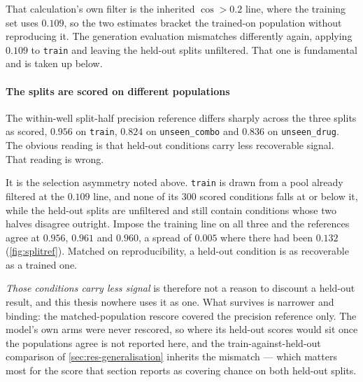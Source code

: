 That calculation's own filter is the inherited $\cos > 0.2$ line, where the
training set uses $0.109$, so the two estimates bracket the trained-on
population without reproducing it. The generation evaluation mismatches
differently again, applying $0.109$ to \texttt{train} and leaving the held-out
splits unfiltered. That one is fundamental and is taken up below.

\paragraph{The splits are scored on different populations} The within-well
split-half precision reference differs sharply across the three splits as
scored, $0.956$ on \texttt{train}, $0.824$ on \texttt{unseen\_combo} and $0.836$
on \texttt{unseen\_drug}. The obvious reading is that held-out conditions carry
less recoverable signal. That reading is wrong.

It is the selection asymmetry noted above. \texttt{train} is drawn from a pool
already filtered at the $0.109$ line, and none of its $300$ scored conditions
falls at or below it, while the held-out splits are unfiltered and still contain
conditions whose two halves disagree outright. Impose the training line on all
three and the references agree at $0.956$, $0.961$ and $0.960$, a spread of
$0.005$ where there had been $0.132$ (\cref{fig:splitref}). Matched on
reproducibility, a held-out condition is as recoverable as a trained one.



\emph{Those conditions carry less signal} is therefore not a reason to discount
a held-out result, and this thesis nowhere uses it as one. What survives is
narrower and binding: the matched-population rescore covered the precision
reference only. The model's own arms were never rescored, so where its held-out
scores would sit once the populations agree is not reported here, and the
train-against-held-out comparison of \cref{sec:res-generalisation} inherits the
mismatch --- which matters most for the score that section reports as covering
chance on both held-out splits.

